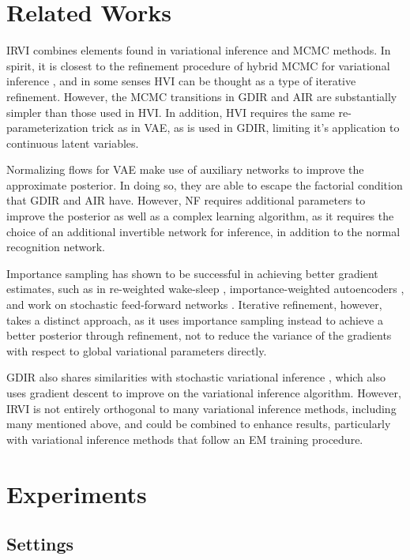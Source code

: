 \documentclass{article} %
\begin{document}
\section{Related Works}
IRVI combines elements found in variational inference and MCMC methods. In
spirit, it is closest to the refinement procedure of hybrid MCMC for variational
inference \citep[HVI,][]{icml2015_salimans15}, and in some senses HVI can be thought as a type of iterative refinement. However, the MCMC transitions in GDIR and AIR are substantially simpler than those used in HVI. In addition, HVI
requires the same re-parameterization trick as in VAE, as is used in GDIR, limiting it's application to continuous latent variables.

Normalizing flows for VAE \citep[NF,][]{rezende2015variational} make use of auxiliary
networks to improve the approximate posterior. In doing so, they are able to
escape the factorial condition that GDIR and AIR have. However, NF requires
additional parameters to improve the posterior as well as a complex learning
algorithm, as it requires the choice of an additional invertible network for inference, in addition to the normal recognition network.

Importance sampling has shown to be successful in achieving better gradient
estimates, such as in re-weighted wake-sleep \citep[RWS,
][]{bornschein2014reweighted}, importance-weighted autoencoders
\citep[IWAE,][]{burda2015importance}, and work on stochastic feed-forward
networks \citep[SFFN, ][]{tang2013learning}. Iterative refinement, however, takes a distinct approach, as it uses
importance sampling instead to achieve a better posterior through refinement, not to reduce the variance of the gradients with respect to global variational parameters directly.

GDIR also shares similarities with stochastic variational inference
\citep{hoffman2013stochastic}, which also uses gradient descent to improve on the
variational inference algorithm. However, IRVI is not entirely orthogonal to many variational inference methods, including many mentioned above, and could be combined to enhance results, particularly with variational inference methods that follow an EM training procedure.

\section{Experiments}

\subsection{Settings}
\end{document}
